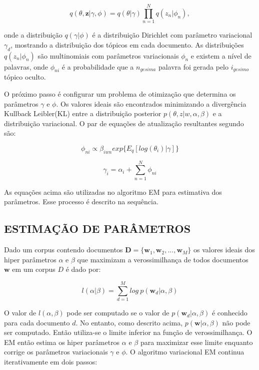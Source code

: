 \documentclass[12pt,a4paper]{article}
\begin{document}
\begin{equation}
q(\theta,\textbf{z}|\gamma,\phi)=q(\theta|\gamma)\prod_{n=1}^{N}q(z_n|\phi_n), 
\end{equation}

onde a distribuição  $q(\gamma|\phi)$ é a distribuição Dirichlet com parâmetro variacional $\gamma_d$, mostrando a distribuição dos tópicos em cada documento.
 As distribuições $q(z_n | \phi_n)$ são multinomiais com parâmetros variacionais $\phi_n$ e existem a nível de palavras, onde $\phi_{ni}$ é a probabilidade que a $n_{gesima}$ palavra foi gerada pelo $i_{gesimo}$ tópico oculto.

O próximo passo é configurar um problema de otimização que determina os parâmetros $\gamma$ e $\phi$. Os valores ideais são encontrados minimizando a divergência Kullback Leibler(KL) entre a distribuição posterior $p(\theta, z|w,\alpha,\beta)$ e a distribuição variacional.
 O par de equações de atualização resultantes segundo  são:

\begin{equation}
\phi_{ni} \propto \beta_{iwn} exp\{E_q[log(\theta_i)|\gamma]\}
\end{equation}

\begin{equation}
\gamma_i = \alpha_i + \sum_{n=1}^{N} \phi_{ni}
\end{equation}

As equações acima são utilizadas no algoritmo EM para estimativa dos parâmetros. Esse processo é descrito na sequência.

\subsection{ESTIMAÇÃO DE PARÂMETROS} \label{sec:estimacao-parametros}
Dado um corpus contendo documentos $\textbf{D} = \{\textbf{w}_1, \textbf{w}_2, . . ., \textbf{w}_M\}$ os valores ideais dos hiper parâmetros $\alpha$ e $\beta$
 que maximizam a verossimilhança de todos documentos $\textbf{w}$ em um corpus $D$ é dado por:

\begin{equation}
l(\alpha|\beta) = \sum_{d=1}^{M} log\ p(\textbf{w}_d|\alpha,\beta)
\end{equation}

O valor de $l(\alpha, \beta)$ pode ser computado se o valor de $p(\textbf{w}_d|\alpha, \beta)$ é conhecido para cada documento $d$. No entanto,
 como descrito acima, $p(\textbf{w}|\alpha,\beta)$ não pode ser computado. Então utiliza-se o limite inferior na função de verossimilhança.
 O EM então estima os hiper parâmetros $\alpha$ e $\beta$ para maximizar esse limite enquanto corrige os parâmetros variacionais $\gamma$ e $\phi$. 
 O algoritmo variacional EM continua iterativamente em dois passos:
\end{document}
